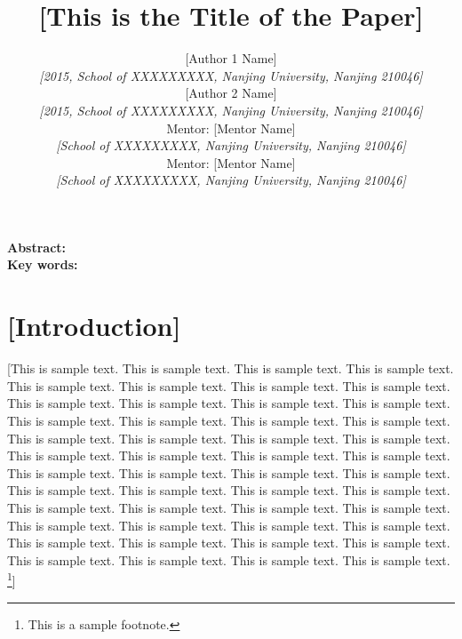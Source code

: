 \documentclass[a4paper,11pt,onecolumn,twoside]{article}
\title{\textbf{[This is the Title of the Paper]}}
\author{
[Author 1 Name]\\[2pt]
{\small \textit{[2015, School of XXXXXXXXX, Nanjing University, Nanjing 210046]}}\\[2pt]
 [Author 2 Name]\\[2pt]
 {\small \textit{[2015, School of XXXXXXXXX, Nanjing University, Nanjing 210046]}}\\[6pt]
Mentor: [Mentor Name]\\[2pt]
{\small \textit{[School of XXXXXXXXX, Nanjing University, Nanjing 210046]}}\\[2pt]
Mentor: [Mentor Name]\\[2pt]
{\small \textit{[School of XXXXXXXXX, Nanjing University, Nanjing 210046]}}\\[2pt]
}
\date{}
\begin{document}
\maketitle
\thispagestyle{fancy}
\setlength{\textwidth}{15.50cm}
\vspace{-.8cm}
\begin{center}
\parbox{\textwidth}{
\textbf{Abstract:} \\

\textbf{Key words:}}
\end{center}

\setcounter{page}{1}

\setlength{\oddsidemargin}{-.5cm}  %
\setlength{\evensidemargin}{\oddsidemargin}
\setlength{\textwidth}{17.00cm}

\section*{[Introduction]}
[This is sample text. This is sample text. This is sample text. This is sample text. This is sample text. This is sample text. This is sample text. This is sample text. This is sample text. This is sample text. This is sample text. This is sample text. This is sample text. This is sample text. This is sample text. This is sample text. This is sample text. This is sample text. This is sample text. This is sample text. This is sample text. This is sample text. This is sample text. This is sample text. This is sample text. This is sample text. This is sample text. This is sample text. This is sample text. This is sample text. This is sample text. This is sample text. This is sample text. This is sample text. This is sample text. This is sample text. This is sample text. This is sample text. This is sample text. This is sample text. This is sample text. This is sample text. This is sample text. This is sample text. This is sample text. This is sample text. This is sample text. This is sample text. \footnote{This is a sample footnote.}]
\end{document}
